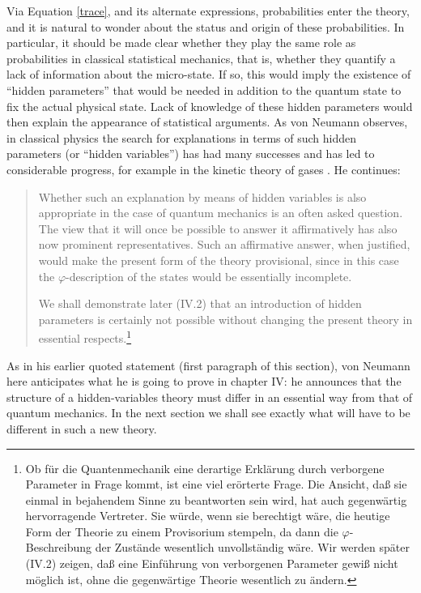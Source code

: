 \documentclass[12pt]{article}
\begin{document}
Via Equation \ref{trace}, and its alternate expressions, probabilities enter the theory, and it is natural to wonder about the status and origin of these probabilities. In particular, it should be made clear whether they play the same role as probabilities in classical statistical mechanics, that is, whether they quantify a lack of information about the micro-state. If so, this would imply the existence of ``hidden parameters'' that would be needed in addition to the quantum state to fix the actual physical state. Lack of knowledge of these hidden parameters would then explain the appearance of statistical arguments. As von Neumann observes, in classical physics the search for explanations in terms of such hidden parameters (or ``hidden variables'') has had many successes and has led to considerable progress, for example in the kinetic theory of gases \cite[p.\@ 109]{VN1}. He continues:
\begin{quote}
  Whether such an explanation by means of hidden variables is also appropriate in the case of quantum mechanics is an often asked question. The view that it will once be possible to answer it affirmatively has also now prominent representatives. Such an affirmative answer, when justified, would make the present form of the theory provisional, since in this case the $\varphi$-description of the states would be essentially incomplete.

  We shall demonstrate later (IV.2) that an introduction of hidden parameters is certainly not possible without changing the present theory in essential respects.\footnote{Ob f\"{u}r die Quantenmechanik eine derartige Erkl\"{a}rung durch verborgene Parameter in Frage kommt, ist eine viel er\"{o}rterte Frage. Die Ansicht, da{\ss} sie einmal in bejahendem Sinne zu beantworten sein wird, hat auch gegenw\"{a}rtig hervorragende Vertreter. Sie w\"{u}rde, wenn sie berechtigt w\"{a}re, die heutige Form der Theorie zu einem Provisorium stempeln, da dann die $\varphi$-Beschreibung der Zust\"{a}nde wesentlich unvollst\"{a}ndig w\"{a}re.
  Wir werden sp\"{a}ter (IV.2) zeigen, da{\ss} eine Einf\"{u}hrung von verborgenen Parameter gewi{\ss} nicht m\"{o}glich ist, ohne die gegenw\"{a}rtige Theorie wesentlich zu \"{a}ndern.}
\end{quote}
As in his earlier quoted statement (first paragraph of this section), von Neumann here anticipates what he is going to prove in chapter IV: he  announces that the structure of a hidden-variables theory must differ in an essential way from that of quantum mechanics. In the next section we shall see exactly what will have to be different in such a new theory.
\end{document}
